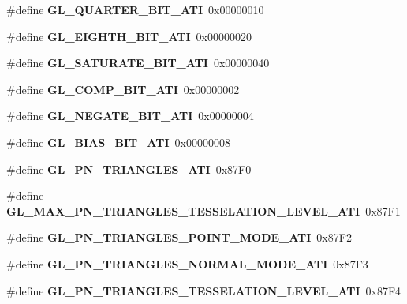 \begin{DoxyCompactItemize}
\item 
\#define {\bfseries G\+L\+\_\+\+Q\+U\+A\+R\+T\+E\+R\+\_\+\+B\+I\+T\+\_\+\+A\+T\+I}~0x00000010\label{_s_d_l__opengl_8h_a12c0f3afe4d5db5cea43c0c6c5e3407c}

\item 
\#define {\bfseries G\+L\+\_\+\+E\+I\+G\+H\+T\+H\+\_\+\+B\+I\+T\+\_\+\+A\+T\+I}~0x00000020\label{_s_d_l__opengl_8h_ae67d2042775226d7e8936a1f137ee77c}

\item 
\#define {\bfseries G\+L\+\_\+\+S\+A\+T\+U\+R\+A\+T\+E\+\_\+\+B\+I\+T\+\_\+\+A\+T\+I}~0x00000040\label{_s_d_l__opengl_8h_af9e47a724f3f585781d99712252be9d5}

\item 
\#define {\bfseries G\+L\+\_\+\+C\+O\+M\+P\+\_\+\+B\+I\+T\+\_\+\+A\+T\+I}~0x00000002\label{_s_d_l__opengl_8h_aa923cafb745c3cfc3cd318e284c61540}

\item 
\#define {\bfseries G\+L\+\_\+\+N\+E\+G\+A\+T\+E\+\_\+\+B\+I\+T\+\_\+\+A\+T\+I}~0x00000004\label{_s_d_l__opengl_8h_a8e63ca39bb5fcf6d95f8c4a6e55b7dad}

\item 
\#define {\bfseries G\+L\+\_\+\+B\+I\+A\+S\+\_\+\+B\+I\+T\+\_\+\+A\+T\+I}~0x00000008\label{_s_d_l__opengl_8h_a8db7b7d37460c9b0af022f5318f5702b}

\item 
\#define {\bfseries G\+L\+\_\+\+P\+N\+\_\+\+T\+R\+I\+A\+N\+G\+L\+E\+S\+\_\+\+A\+T\+I}~0x87\+F0\label{_s_d_l__opengl_8h_a31727dc0f01750719bfa5c814f24e33c}

\item 
\#define {\bfseries G\+L\+\_\+\+M\+A\+X\+\_\+\+P\+N\+\_\+\+T\+R\+I\+A\+N\+G\+L\+E\+S\+\_\+\+T\+E\+S\+S\+E\+L\+A\+T\+I\+O\+N\+\_\+\+L\+E\+V\+E\+L\+\_\+\+A\+T\+I}~0x87\+F1\label{_s_d_l__opengl_8h_a52e14ca9f9922e9b735e8513607880fa}

\item 
\#define {\bfseries G\+L\+\_\+\+P\+N\+\_\+\+T\+R\+I\+A\+N\+G\+L\+E\+S\+\_\+\+P\+O\+I\+N\+T\+\_\+\+M\+O\+D\+E\+\_\+\+A\+T\+I}~0x87\+F2\label{_s_d_l__opengl_8h_a3f8de3283a47109fb9469341ddcd6c95}

\item 
\#define {\bfseries G\+L\+\_\+\+P\+N\+\_\+\+T\+R\+I\+A\+N\+G\+L\+E\+S\+\_\+\+N\+O\+R\+M\+A\+L\+\_\+\+M\+O\+D\+E\+\_\+\+A\+T\+I}~0x87\+F3\label{_s_d_l__opengl_8h_ae81bc10b86fbabe8cea302e0420d4124}

\item 
\#define {\bfseries G\+L\+\_\+\+P\+N\+\_\+\+T\+R\+I\+A\+N\+G\+L\+E\+S\+\_\+\+T\+E\+S\+S\+E\+L\+A\+T\+I\+O\+N\+\_\+\+L\+E\+V\+E\+L\+\_\+\+A\+T\+I}~0x87\+F4\label{_s_d_l__opengl_8h_aebe2311d500628e30bd79931ae4f4b2a}


\end{DoxyCompactItemize}
